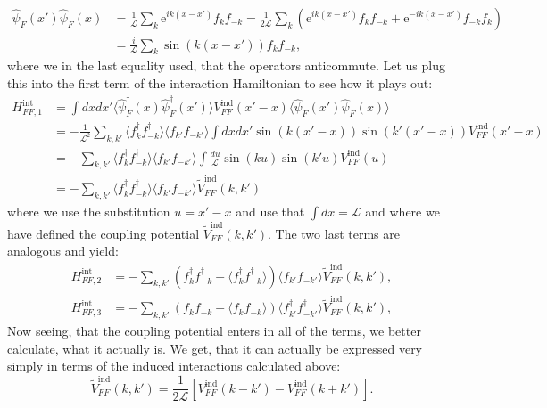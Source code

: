 \begin{align}
\hat{\psi}_F(x') \hat{\psi}_F(x) &= \frac{1}{\mathcal{L}}\sum_{k} \text{e}^{ik(x-x')}f_kf_{-k} = \frac{1}{2\mathcal{L}}\sum_{k} \left(\text{e}^{ik(x-x')}f_{k}f_{-k}+\text{e}^{-ik(x-x')}f_{-k}f_{k}\right) \nonumber \\
&= \frac{i}{\mathcal{L}}\sum_{k} \sin(k(x-x'))f_{k}f_{-k}, 
\end{align}
where we in the last equality used, that the operators anticommute. Let us plug this into the first term of the interaction Hamiltonian to see how it plays out: 
\begin{align}
H^\text{int}_{FF,1} &= \int dxdx' \langle \hat{\psi}^\dagger_F(x) \hat{\psi}^\dagger_F(x') \rangle V^\text{ind}_{FF}(x'-x) \langle \hat{\psi}_F(x') \hat{\psi}_F(x) \rangle \nonumber \\
&= - \frac{1}{\mathcal{L}^2}\sum_{k,k'}\langle f^\dagger_{k}f^\dagger_{-k} \rangle \langle f_{k'}f_{-k'} \rangle \int dx dx' \sin(k(x'-x))\sin(k'(x'-x))V^\text{ind}_{FF}(x'-x) \nonumber \\
&= - \sum_{k,k'}\langle f^\dagger_{k}f^\dagger_{-k} \rangle \langle f_{k'}f_{-k'} \rangle \int \frac{du}{\mathcal{L}} \sin(ku)\sin(k'u)V^\text{ind}_{FF}(u) \nonumber \\
&= - \sum_{k,k'}\langle f^\dagger_{k}f^\dagger_{-k} \rangle \langle f_{k'}f_{-k'} \rangle \tilde{V}^\text{ind}_{FF}(k,k')
\end{align}
where we use the substitution $u = x'-x$ and use that $\int dx = \mathcal{L}$ and where we have defined the coupling potential $\tilde{V}^\text{ind}_{FF}(k,k')$. The two last terms are analogous and yield:
\begin{align}
H^\text{int}_{FF,2} &= - \sum_{k,k'}\left(f^\dagger_k f^\dagger_{-k} - \langle f^\dagger_k f^\dagger_{-k}\rangle\right)\langle f_{k'}f_{-k'} \rangle \tilde{V}^\text{ind}_{FF}(k,k'), \nonumber \\
H^\text{int}_{FF,3} &= - \sum_{k,k'}\left(f_k f_{-k} - \langle f_k f_{-k}\rangle\right)\langle f^\dagger_{k'}f^\dagger_{-k'} \rangle \tilde{V}^\text{ind}_{FF}(k,k'), \nonumber
\end{align}
Now seeing, that the coupling potential enters in all of the terms, we better calculate, what it actually is. We get, that it can actually be expressed very simply in terms of the induced interactions calculated above:
\begin{equation}
\tilde{V}^\text{ind}_{FF}(k,k') = \frac{1}{2\mathcal{L}}\left[ V^\text{ind}_{FF}(k-k') - V^\text{ind}_{FF}(k+k')  \right].
\end{equation}
